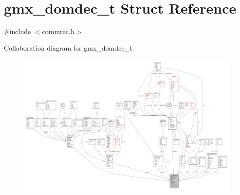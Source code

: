 \hypertarget{structgmx__domdec__t}{\section{gmx\-\_\-domdec\-\_\-t \-Struct \-Reference}
\label{structgmx__domdec__t}
}


{\ttfamily \#include $<$commrec.\-h$>$}



\-Collaboration diagram for gmx\-\_\-domdec\-\_\-t\-:
\nopagebreak
\begin{figure}[H]
\begin{center}
\leavevmode
\includegraphics[width=350pt]{structgmx__domdec__t__coll__graph}
\end{center}
\end{figure}

